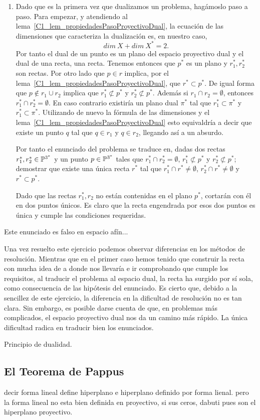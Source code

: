 \begin{exa}
\begin{enumerate}
		\item Dado que es la primera vez que dualizamos un problema, hagámoslo paso a paso. Para empezar, y atendiendo al lema~\ref{C1_lem_propiedadesPasoProyectivoDual}, la ecuación de las dimensiones que caracteriza la dualización es, en nuestro caso,
		\begin{equation*}
			dim \ X+dim \ X^*=2. 
		\end{equation*}
		Por tanto el dual de un punto es un plano del espacio proyectivo dual y el dual de una recta, una recta. Tenemos entonces que $p^*$ es un plano y $r_1^*,r_2^*$ son rectas. Por otro lado que $p\in r$ implica, por el lema~\ref{C1_lem_propiedadesPasoProyectivoDual}, que $r^*\subset p^*$. De igual forma que $p\not\in r_1\cup r_2$ implica que $r_1^*\not\subset p^*$ y $r_2^*\not\subset p^*$. Además si $r_1\cap r_2=\emptyset$, entonces $r_1^*\cap r_2^*=\emptyset$. En caso contrario existiría un plano dual $\pi^*$ tal que $r_1^*\subset\pi^*$ y $r_1^*\subset\pi^*$. Utilizando de nuevo la fórmula de las dimensiones y el lema~\ref{C1_lem_propiedadesPasoProyectivoDual} esto equivaldría a decir que existe un punto $q$ tal que $q\in r_1$ y $q\in r_2$, llegando así a un absurdo.
		
		Por tanto el enunciado del problema se traduce en, dadas dos rectas $r_1^*, r_2^*\in\mathbb{P}^{3^*}$ y un punto $p\in\mathbb{P}^{3^*}$ tales que $r_1^*\cap r_2^*=\emptyset$, $r_1^*\not\subset p^*$ y $r_2^*\not\subset p^*$; demostrar que existe una única recta $r^*$ tal que $r_1^*\cap r^*\not=\emptyset$, $r_2^*\cap r^*\not=\emptyset$ y $r^*\subset p^*$.
		
		Dado que las rectas $r_1^*, r_2$ no están contenidas en el plano $p^*$, cortarán con él en dos puntos únicos. Es claro que la recta engendrada por esos dos puntos es única y cumple las condiciones requeridas.
	\end{enumerate}
\end{exa}
\begin{obs}
	Este enunciado es falso en espacio afín...
\end{obs}
\begin{obs}
	Una vez resuelto este ejercicio podemos observar diferencias en los métodos de resolución. Mientras que en el primer caso hemos tenido que construir la recta con mucha idea de a donde nos llevaría e ir comprobando que cumple los requisitos, al traducir el problema al espacio dual, la recta ha surgido por sí sola, como consecuencia de las hipótesis del enunciado. Es cierto que, debido a la sencillez de este ejercicio, la diferencia en la dificultad de resolución no es tan clara. Sin embargo, es posible darse cuenta de que, en problemas más complicados, el espacio proyectivo dual nos da un camino más rápido. La única dificultad radica en traducir bien los enunciados.
\end{obs}
Principio de dualidad.

\subsection{El Teorema de Pappus}

decir forma lineal define hiperplano e hiperplano definido por forma lienal. pero la forma lineal no esta bien definida en proyectivo, si sus ceros, dabuti pues son el hiperplano proyectivo.